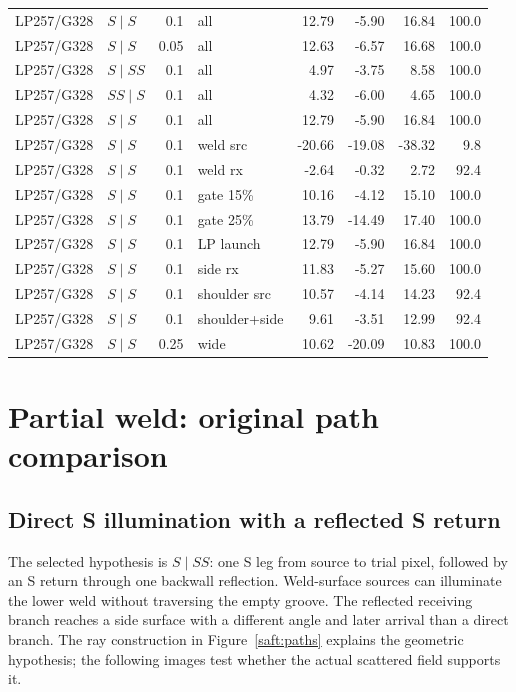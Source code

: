 \documentclass[11pt]{article}
\begin{document}
{\begin{longtable}{@{}llrlrrrr@{}}
LP257/G328 & $S\mid S$ & 0.1 & all & 12.79 & -5.90 & 16.84 & 100.0 \\
LP257/G328 & $S\mid S$ & 0.05 & all & 12.63 & -6.57 & 16.68 & 100.0 \\
LP257/G328 & $S\mid SS$ & 0.1 & all & 4.97 & -3.75 & 8.58 & 100.0 \\
LP257/G328 & $SS\mid S$ & 0.1 & all & 4.32 & -6.00 & 4.65 & 100.0 \\
LP257/G328 & $S\mid S$ & 0.1 & all & 12.79 & -5.90 & 16.84 & 100.0 \\
LP257/G328 & $S\mid S$ & 0.1 & weld src & -20.66 & -19.08 & -38.32 & 9.8 \\
LP257/G328 & $S\mid S$ & 0.1 & weld rx & -2.64 & -0.32 & 2.72 & 92.4 \\
LP257/G328 & $S\mid S$ & 0.1 & gate 15\% & 10.16 & -4.12 & 15.10 & 100.0 \\
LP257/G328 & $S\mid S$ & 0.1 & gate 25\% & 13.79 & -14.49 & 17.40 & 100.0 \\
LP257/G328 & $S\mid S$ & 0.1 & LP launch & 12.79 & -5.90 & 16.84 & 100.0 \\
LP257/G328 & $S\mid S$ & 0.1 & side rx & 11.83 & -5.27 & 15.60 & 100.0 \\
LP257/G328 & $S\mid S$ & 0.1 & shoulder src & 10.57 & -4.14 & 14.23 & 92.4 \\
LP257/G328 & $S\mid S$ & 0.1 & shoulder+side & 9.61 & -3.51 & 12.99 & 92.4 \\
LP257/G328 & $S\mid S$ & 0.25 & wide & 10.62 & -20.09 & 10.83 & 100.0 \\
\end{longtable}}


\section{Partial weld: original path comparison}
\label{saft:partial}
\label{saft:archive:partial:principal}
\subsection{Direct S illumination with a reflected S return}
The selected hypothesis is $S\mid SS$: one S leg from source to trial pixel, followed by an S return through one backwall reflection. Weld-surface sources can illuminate the lower weld without traversing the empty groove. The reflected receiving branch reaches a side surface with a different angle and later arrival than a direct branch. The ray construction in Figure~\ref{saft:paths} explains the geometric hypothesis; the following images test whether the actual scattered field supports it.
\end{document}
